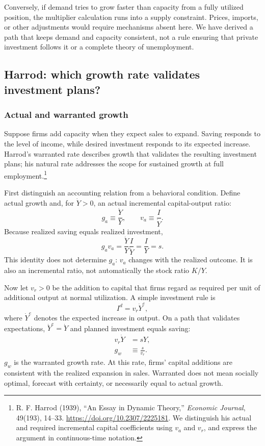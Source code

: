Conversely, if demand tries to grow faster than capacity from a fully utilized
position, the multiplier calculation runs into a supply constraint. Prices,
imports, or other adjustments would require mechanisms absent here. We have
derived a path that keeps demand and capacity consistent, not a rule ensuring
that private investment follows it or a complete theory of unemployment.

\subsection{Harrod: which growth rate validates investment plans?}

\subsubsection{Actual and warranted growth}

Suppose firms add capacity when they expect sales to expand. Saving responds
to the level of income, while desired investment responds to its expected
increase. Harrod's warranted rate describes growth that validates the resulting
investment plans; his natural rate addresses the scope for sustained growth at
full employment.\footnote{R. F. Harrod (1939), ``An Essay in Dynamic Theory,''
\textit{Economic Journal}, 49(193), 14--33.
\url{https://doi.org/10.2307/2225181}. We distinguish his actual and required
incremental capital coefficients using $v_a$ and $v_r$, and express the argument
in continuous-time notation.}

First distinguish an accounting relation from a behavioral condition. Define
actual growth and, for $\dot Y>0$, an actual incremental capital-output ratio:
\begin{equation}
g_a\equiv\frac{\dot Y}{Y},\qquad v_a\equiv\frac{I}{\dot Y}.
\end{equation}
Because realized saving equals realized investment,
\begin{equation}\label{eq:harrod-actual-identity}
g_av_a=\frac{\dot Y}{Y}\frac{I}{\dot Y}=\frac{I}{Y}=s.
\end{equation}
This identity does not determine $g_a$: $v_a$ changes with the realized outcome.
It is also an incremental ratio, not automatically the stock ratio $K/Y$.

Now let $v_r>0$ be the addition to capital that firms regard as required per
unit of additional output at normal utilization. A simple investment rule is
\begin{equation}
I^d=v_r\dot Y^e,
\end{equation}
where $\dot Y^e$ denotes the expected increase in output. On a path that
validates expectations, $\dot Y^e=\dot Y$ and planned investment equals saving:
\begin{align}
v_r\dot Y&=sY,\\
g_w&\equiv\frac{s}{v_r}.\label{eq:harrod-warranted}
\end{align}
$g_w$ is the warranted growth rate. At this rate, firms' capital additions are
consistent with the realized expansion in sales. Warranted does not mean
socially optimal, forecast with certainty, or necessarily equal to actual growth.

